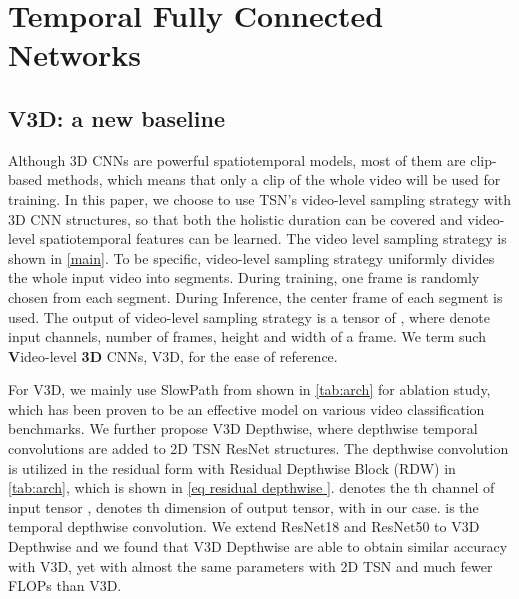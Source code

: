 \documentclass[nohyperref]{article}
\theoremstyle{plain}
\theoremstyle{definition}
\theoremstyle{remark}
\begin{document}
\section{Temporal Fully Connected Networks}
\label{sec:TFC}
\subsection{V3D: a new baseline}

Although 3D CNNs are powerful spatiotemporal models, most of them are clip-based methods, which means that only a clip of the whole video will be used for training. In this paper, we choose to use TSN's video-level sampling strategy with 3D CNN structures, so that both the holistic duration can be covered and video-level spatiotemporal features can be learned. The video level sampling strategy is shown in \cref{main}. To be specific,  video-level sampling strategy uniformly divides the whole input video into  segments. During training, one frame is randomly chosen from each segment. During Inference, the center frame of each segment is used. The output of video-level sampling strategy is a tensor of , where  denote input channels, number of frames, height and width of a frame.  We term such {\bf V}ideo-level {\bf 3D} CNNs, V3D, for the ease of reference.


For V3D, we mainly use SlowPath from \cite{DBLP:journals/corr/abs-1812-03982} shown in \cref{tab:arch} for ablation study, which has been proven to be an effective model on various video classification benchmarks. We further propose  V3D Depthwise, where depthwise temporal convolutions are added to 2D TSN ResNet structures. The depthwise convolution is utilized in the residual form \cite{DBLP:conf/cvpr/HeZRS16} with Residual Depthwise Block (RDW) in  \cref{tab:arch}, which is shown in  \cref{eq residual depthwise }.  denotes the th channel of input tensor ,  denotes th dimension of output tensor, with  in our case.  is the temporal depthwise convolution. We extend ResNet18 and ResNet50 to V3D Depthwise and we found that V3D Depthwise are able to obtain similar accuracy with V3D, yet with almost the same parameters with 2D TSN and much fewer FLOPs than V3D. 
\end{document}

